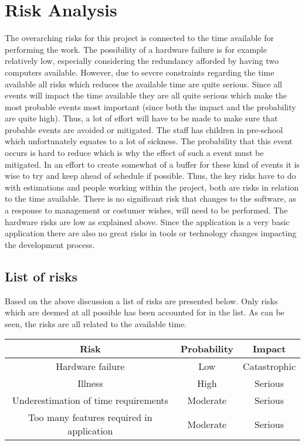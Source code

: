 \documentclass[12pt, letterpaper]{article}
\begin{document}
\section{Risk Analysis}
The overarching risks for this project is connected to the time available for performing the work. The possibility of a hardware failure is for example relatively low, especially considering the redundancy afforded by having two computers available. However, due to severe constraints regarding the time available all risks which reduces the available time are quite serious. Since all events will impact the time available they are all quite serious which make the most probable events most important (since both the impact and the probability are quite high). Thus, a lot of effort will have to be made to make sure that probable events are avoided or mitigated. The staff has children in pre-school which unfortunately equates to a lot of sickness. The probability that this event occurs is hard to reduce which is why the effect of such a event must be mitigated. In an effort to create somewhat of a buffer for these kind of events it is wise to try and keep ahead of schedule if possible.
\newline
\newline
Thus, the key risks have to do with estimations and people working within the project, both are risks in relation to the time available. There is no significant risk that changes to the software, as a response to management or costumer wishes, will need to be performed. The hardware risks are low as explained above. Since the application is a very basic application there are also no great risks in tools or technology changes impacting the development process. 
\subsection{List of risks}
Based on the above discussion a list of risks are presented below. Only risks which are deemed at all possible has been accounted for in the list. As can be seen, the risks are all related to the available time.
\begin{center}
	\begin{tabular}{|c|c|c|} 
		\hline
		Risk & Probability & Impact\\ [0.5ex] 
		\hline\hline
		Hardware failure & Low & Catastrophic \\ 
		\hline
		Illness & High & Serious \\
		\hline
		Underestimation of time requirements & Moderate & Serious \\ 
		\hline
		Too many features required in application & Moderate & Serious \\ 
		\hline
		
	\end{tabular}
\end{center}
\end{document}
